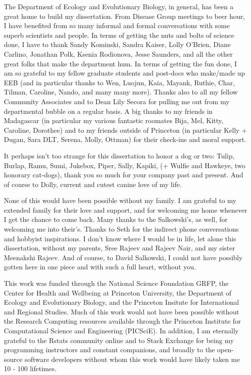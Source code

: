 \documentclass[
  oneside]{book}
\begin{document}
The Department of Ecology and Evolutionary Biology, in general, has been a great home to build my dissertation. From Disease Group meetings to beer hour, I have benefited from so many informal and formal conversations with some superb scientists and people. In terms of getting the nuts and bolts of science done, I have to thank Sandy Kominski, Sandra Kaiser, Lolly O'Brien, Diane Carlino, Jonathan Polk, Ksenia Rodionova, Jesse Saunders, and all the other great folks that make the department hum. In terms of getting the fun done, I am so grateful to my fellow graduate students and post-docs who make/made up EEB (and in particular thanks to Wen, Luojun, Kaia, Mayank, Ruthie, Char, Tilman, Caroline, Nando, and many many more). Thanks also to all my fellow Community Associates and to Dean Lily Secora for pulling me out from my departmental bubble on a regular basis. A big thanks to my friends in Madagascar (in particular my various fantastic roomates Bija, Mel, Kitty, Caroline, Dorothee) and to my friends outside of Princeton (in particular Kelly + Dugan, Sara DLT, Serena, Molly, Ottman) for their check-ins and moral support.

It perhaps isn't too strange for this dissertation to honor a dog or two: Tulip, Burlap, Ramu, Sumi, Jukebox, Piper, Sally, Kapiki, (+ Wulfie and Hawkeye, two honorary cat-dogs), thank you so much for your company past and present. And of course to Dolly, current and cutest canine love of my life. 

None of this would have been possible without my family. I am grateful to my extended family for their love and support, and for welcoming me home whenever I get the chance to come back. Many thanks to the Salkowski's, as well, for welcoming me into their's. Thanks to Seth for the indirect phone conversations and hobbyist inspirations. I don't know where I would be in life, let alone this dissertation, without my parents, Sree Rajeev and Rajeev Nair, and my sister Meenakshi Rajeev. And of course, to David Salkowski, I could not have possibly gotten here in one piece and with such a full heart, without you. 

This work was funded through the National Science Foundation GRFP, the Center for Health and Wellbeing at Princeton University, the Department of Ecology and Evolutionary Biology, and the Princeton Insitute for International and Regional Studies. Much of this work would not have been possible without the Research Computing resources available through the Princeton Institute for Computational Science and Engineering (PICSciE). In addition, I am eternally grateful to the Rstats community online and to Stack Exchange for being my programming instructors and constant companions, and broadly to the open-source software developers without whom this work would have likely taken me 10 - 100 lifetimes.
\end{document}
